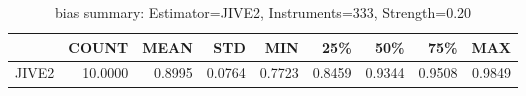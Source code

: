 \begin{table}[ht]
\centering
\caption{bias summary: Estimator=JIVE2, Instruments=333, Strength=0.20}
\begin{tabular}{lrrrrrrrr}
\toprule
 & COUNT & MEAN & STD & MIN & 25\% & 50\% & 75\% & MAX \\
\midrule
JIVE2 & 10.0000 & 0.8995 & 0.0764 & 0.7723 & 0.8459 & 0.9344 & 0.9508 & 0.9849 \\
\bottomrule
\end{tabular}
\end{table}
